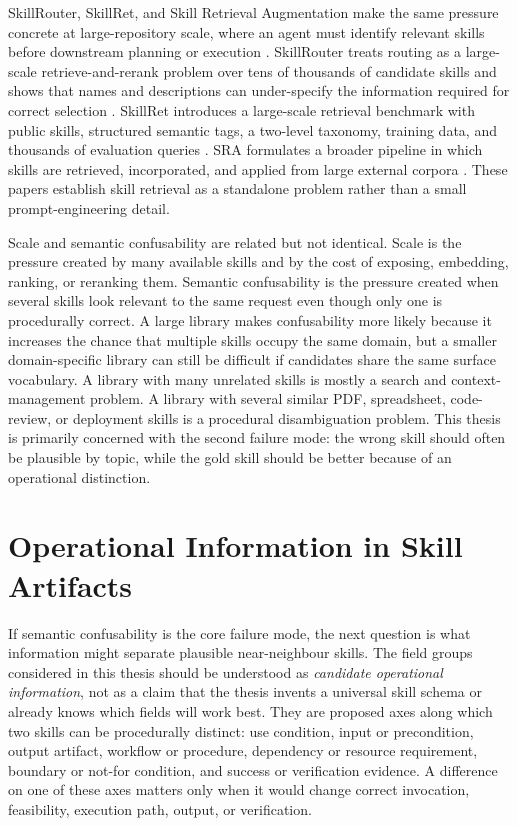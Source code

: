 SkillRouter, SkillRet, and Skill Retrieval Augmentation make the same pressure concrete at large-repository scale, where an agent must identify relevant skills before downstream planning or execution \cite{zheng2026skillrouter,cho2026skillret,su2026sra}. SkillRouter treats routing as a large-scale retrieve-and-rerank problem over tens of thousands of candidate skills and shows that names and descriptions can under-specify the information required for correct selection \cite{zheng2026skillrouter}. SkillRet introduces a large-scale retrieval benchmark with public skills, structured semantic tags, a two-level taxonomy, training data, and thousands of evaluation queries \cite{cho2026skillret}. SRA formulates a broader pipeline in which skills are retrieved, incorporated, and applied from large external corpora \cite{su2026sra}. These papers establish skill retrieval as a standalone problem rather than a small prompt-engineering detail.

Scale and semantic confusability are related but not identical. Scale is the pressure created by many available skills and by the cost of exposing, embedding, ranking, or reranking them. Semantic confusability is the pressure created when several skills look relevant to the same request even though only one is procedurally correct. A large library makes confusability more likely because it increases the chance that multiple skills occupy the same domain, but a smaller domain-specific library can still be difficult if candidates share the same surface vocabulary. A library with many unrelated skills is mostly a search and context-management problem. A library with several similar PDF, spreadsheet, code-review, or deployment skills is a procedural disambiguation problem. This thesis is primarily concerned with the second failure mode: the wrong skill should often be plausible by topic, while the gold skill should be better because of an operational distinction.

\section{Operational Information in Skill Artifacts}

If semantic confusability is the core failure mode, the next question is what information might separate plausible near-neighbour skills. The field groups considered in this thesis should be understood as \emph{candidate operational information}, not as a claim that the thesis invents a universal skill schema or already knows which fields will work best. They are proposed axes along which two skills can be procedurally distinct: use condition, input or precondition, output artifact, workflow or procedure, dependency or resource requirement, boundary or not-for condition, and success or verification evidence. A difference on one of these axes matters only when it would change correct invocation, feasibility, execution path, output, or verification.

